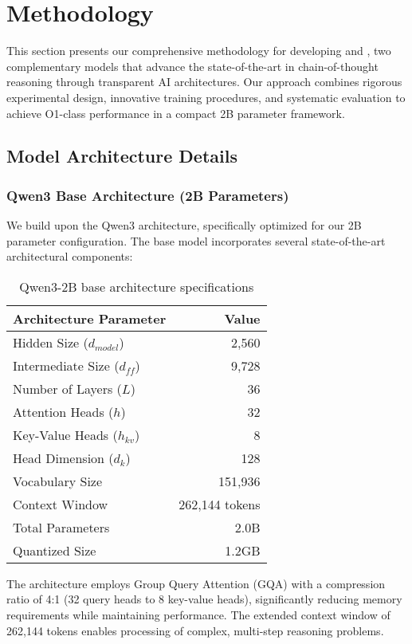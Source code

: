 \section{Methodology}
\label{sec:methodology}

This section presents our comprehensive methodology for developing \supra{} and \zennano{}, two complementary models that advance the state-of-the-art in chain-of-thought reasoning through transparent AI architectures. Our approach combines rigorous experimental design, innovative training procedures, and systematic evaluation to achieve O1-class performance in a compact 2B parameter framework.

\subsection{Model Architecture Details}

\subsubsection{Qwen3 Base Architecture (2B Parameters)}
We build upon the Qwen3 architecture, specifically optimized for our 2B parameter configuration. The base model incorporates several state-of-the-art architectural components:

\begin{table}[H]
\centering
\begin{tabular}{lr}
\toprule
Architecture Parameter & Value \\
\midrule
Hidden Size ($d_{model}$) & 2,560 \\
Intermediate Size ($d_{ff}$) & 9,728 \\
Number of Layers ($L$) & 36 \\
Attention Heads ($h$) & 32 \\
Key-Value Heads ($h_{kv}$) & 8 \\
Head Dimension ($d_k$) & 128 \\
Vocabulary Size & 151,936 \\
Context Window & 262,144 tokens \\
Total Parameters & 2.0B \\
Quantized Size & 1.2GB \\
\bottomrule
\end{tabular}
\caption{Qwen3-2B base architecture specifications}
\label{tab:qwen3-architecture}
\end{table}

The architecture employs Group Query Attention (GQA) with a compression ratio of 4:1 (32 query heads to 8 key-value heads), significantly reducing memory requirements while maintaining performance. The extended context window of 262,144 tokens enables processing of complex, multi-step reasoning problems.

